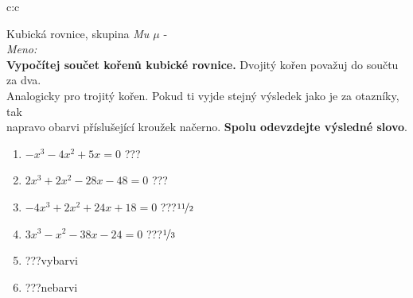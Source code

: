 \documentclass[10pt]{report}
\begin{document}
\clearpage
\thispagestyle{empty}
\begin{tabular}{c:c}
\begin{minipage}[c][99mm][t]{0.49\linewidth}
\begin{center}
\vspace{7mm}
{\huge Kubická rovnice, skupina \textit{Mu $\mu$} -}\\[4.5mm]
\textit{Meno:}\phantom{xxxxxxxxxxxxxxxxxxxxxxxxxxxxxxxxxxxxxxxxxxxxxxxxxxxxxxxxxxxxxxxxx}\\[3.5mm]
\textbf{Vypočítej součet kořenů kubické rovnice.} Dvojitý kořen považuj do součtu za dva.\\Analogicky pro trojitý kořen. Pokud ti vyjde stejný výsledek jako je za otazníky, tak\\napravo obarvi příslušející kroužek načerno. \textbf{Spolu odevzdejte výsledné slovo}.\\[3mm]
\begin{minipage}{0.77\linewidth}
\begin{center}
\begin{varwidth}{\textwidth}
\begin{enumerate}
\large
\item $-x^3-4x^2+5x=0$\quad \dotfill\; ???\;\dotfill {}
\item $2x^3+2x^2-28x-48=0$\quad \dotfill\; ???\;\dotfill {}
\item $-4x^3+2x^2+24x+18=0$\quad \dotfill\; ???\;\dotfill \quad $\nicefrac{11}{2}$
\item $3x^3-x^2-38x-24=0$\quad \dotfill\; ???\;\dotfill \quad $\nicefrac{1}{3}$
\item \quad \dotfill\; ???\;\dotfill \quad vybarvi
\item \quad \dotfill\; ???\;\dotfill \quad nebarvi
\end{enumerate}
\end{varwidth}
\end{center}
\end{minipage}
\begin{minipage}{0.20\linewidth}

\end{minipage}
\end{center}
\end{minipage}
\end{tabular}
\end{document}
